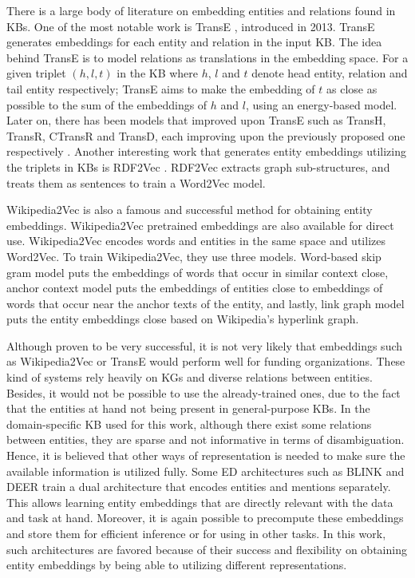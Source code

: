 \documentclass{report}
\theoremstyle{definition}
\theoremstyle{remark}
\begin{document}
There is a large body of literature on embedding entities and relations found in KBs. One of the most notable work is TransE \cite{TransE}, introduced in 2013. TransE generates embeddings for each entity and relation in the input KB. The idea behind TransE is to model relations as translations in the embedding space. For a given triplet $(h,l,t)$ in the KB where $h$, $l$ and $t$ denote head entity, relation and tail entity respectively; TransE aims to make the embedding of $t$ as close as possible to the sum of the embeddings of $h$ and $l$, using an energy-based model. Later on, there has been models that improved upon TransE such as TransH, TransR, CTransR and TransD, each improving upon the previously proposed one respectively  \cite{TransEimproved}. Another interesting work that generates entity embeddings utilizing the triplets in KBs is RDF2Vec \cite{RDF2Vec}. RDF2Vec extracts graph sub-structures, and treats them as sentences to train a Word2Vec model. 

Wikipedia2Vec \cite{wikipedia2vec2} is also a famous and successful method for obtaining entity embeddings. Wikipedia2Vec pretrained embeddings are also available for direct use. Wikipedia2Vec encodes words and entities in the same space and utilizes Word2Vec. To train Wikipedia2Vec, they use three models. Word-based skip gram model puts the embeddings of words that occur in similar context close, anchor context model puts the embeddings of entities close to embeddings of words that occur near the anchor texts of the entity, and lastly, link graph model puts the entity embeddings close based on Wikipedia's hyperlink graph. 

Although proven to be very successful, it is not very likely that embeddings such as Wikipedia2Vec or TransE would perform well for funding organizations. These kind of systems rely heavily on KGs and diverse relations between entities. Besides, it would not be possible to use the already-trained ones, due to the fact that the entities at hand not being present in general-purpose KBs. In the domain-specific KB used for this work, although there exist some relations between entities, they are sparse and not informative in terms of disambiguation. Hence, it is believed that other ways of representation is needed to make sure the available information is utilized fully. Some ED architectures such as BLINK and DEER train a dual architecture that encodes entities and mentions separately. This allows learning entity embeddings that are directly relevant with the data and task at hand. Moreover, it is again possible to precompute these embeddings and store them for efficient inference or for using in other tasks. In this work, such architectures are favored because of their success and flexibility on obtaining entity embeddings by being able to utilizing different representations.
\end{document}

